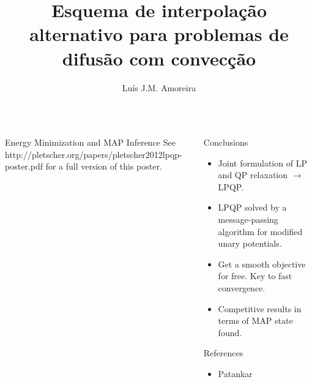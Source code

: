 \documentclass[final,t]{beamer}
\title{\LARGE Esquema de interpolação alternativo para problemas de difusão com
convecção}
\author{Luís J.M. Amoreira}
\institute{\ }
\begin{document}
\begin{frame}{}
\begin{columns}[t]


\begin{column}{.488\linewidth}

    \begin{exampleblock}{Energy Minimization and MAP Inference}
        See http://pletscher.org/papers/pletscher2012lpqp-poster.pdf for a
        full version of this poster.
    \end{exampleblock}

\end{column}


\hfill
\begin{column}{.488\linewidth}
  
    \begin{alertblock}{Conclusions}
        \begin{itemize}
            \item Joint formulation of LP and QP relaxation $\rightarrow$ LPQP.
            \item LPQP solved by a message-passing
            algorithm for modified unary potentials.
            \item Get a smooth objective for free. Key to fast convergence.
            \item Competitive results in terms of MAP state found.
        \end{itemize}
    \end{alertblock}

    \begin{block}{References}
        \vskip -0.8cm
        \footnotesize
        \begin{itemize}
            \item Patankar
        \end{itemize}
        \normalsize
        \vskip -0.8cm
    \end{block}


\end{column}



\end{columns}
\end{frame}
\end{document}

